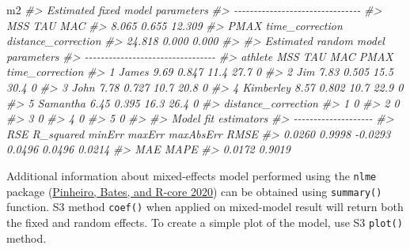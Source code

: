 \documentclass[fleqn,10pt,lineno]{wlpeerj} %
\newenvironment{Shaded}{\begin{snugshade}}{\end{snugshade}}
\newcommand{\CommentTok}[1]{\textcolor[rgb]{0.56,0.35,0.01}{\textit{#1}}}
\newcommand{\NormalTok}[1]{#1}
\begin{document}
\begin{Shaded}
\begin{Highlighting}[]
\NormalTok{m2}
\CommentTok{\#\textgreater{} Estimated fixed model parameters}
\CommentTok{\#\textgreater{} {-}{-}{-}{-}{-}{-}{-}{-}{-}{-}{-}{-}{-}{-}{-}{-}{-}{-}{-}{-}{-}{-}{-}{-}{-}{-}{-}{-}{-}{-}{-}{-}}
\CommentTok{\#\textgreater{}                 MSS                 TAU                 MAC }
\CommentTok{\#\textgreater{}               8.065               0.655              12.309 }
\CommentTok{\#\textgreater{}                PMAX     time\_correction distance\_correction }
\CommentTok{\#\textgreater{}              24.818               0.000               0.000 }
\CommentTok{\#\textgreater{} }
\CommentTok{\#\textgreater{} Estimated random model parameters}
\CommentTok{\#\textgreater{} {-}{-}{-}{-}{-}{-}{-}{-}{-}{-}{-}{-}{-}{-}{-}{-}{-}{-}{-}{-}{-}{-}{-}{-}{-}{-}{-}{-}{-}{-}{-}{-}{-}}
\CommentTok{\#\textgreater{}     athlete  MSS   TAU  MAC PMAX time\_correction}
\CommentTok{\#\textgreater{} 1     James 9.69 0.847 11.4 27.7               0}
\CommentTok{\#\textgreater{} 2       Jim 7.83 0.505 15.5 30.4               0}
\CommentTok{\#\textgreater{} 3      John 7.78 0.727 10.7 20.8               0}
\CommentTok{\#\textgreater{} 4 Kimberley 8.57 0.802 10.7 22.9               0}
\CommentTok{\#\textgreater{} 5  Samantha 6.45 0.395 16.3 26.4               0}
\CommentTok{\#\textgreater{}   distance\_correction}
\CommentTok{\#\textgreater{} 1                   0}
\CommentTok{\#\textgreater{} 2                   0}
\CommentTok{\#\textgreater{} 3                   0}
\CommentTok{\#\textgreater{} 4                   0}
\CommentTok{\#\textgreater{} 5                   0}
\CommentTok{\#\textgreater{} }
\CommentTok{\#\textgreater{} Model fit estimators}
\CommentTok{\#\textgreater{} {-}{-}{-}{-}{-}{-}{-}{-}{-}{-}{-}{-}{-}{-}{-}{-}{-}{-}{-}{-}}
\CommentTok{\#\textgreater{}       RSE R\_squared    minErr    maxErr maxAbsErr      RMSE }
\CommentTok{\#\textgreater{}    0.0260    0.9998   {-}0.0293    0.0496    0.0496    0.0214 }
\CommentTok{\#\textgreater{}       MAE      MAPE }
\CommentTok{\#\textgreater{}    0.0172    0.9019}
\end{Highlighting}
\end{Shaded}

Additional information about mixed-effects model performed using the \texttt{nlme} package (\protect\hyperlink{ref-R-nlme}{Pinheiro, Bates, and R-core 2020}) can be obtained using \texttt{summary()} function. S3 method \texttt{coef()} when applied on mixed-model result will return both the fixed and random effects. To create a simple plot of the model, use S3 \texttt{plot()} method.
\end{document}
